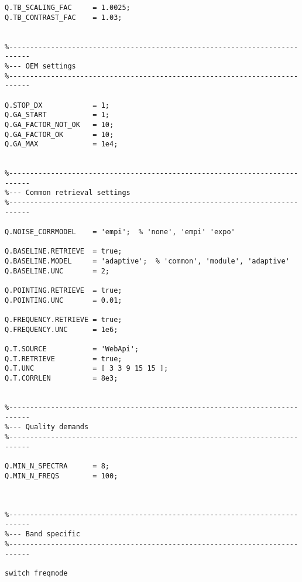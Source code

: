 \begin{verbatim}
Q.TB_SCALING_FAC     = 1.0025;
Q.TB_CONTRAST_FAC    = 1.03;


%---------------------------------------------------------------------------
%--- OEM settings
%---------------------------------------------------------------------------

Q.STOP_DX            = 1;
Q.GA_START           = 1;
Q.GA_FACTOR_NOT_OK   = 10;
Q.GA_FACTOR_OK       = 10;
Q.GA_MAX             = 1e4;


%---------------------------------------------------------------------------
%--- Common retrieval settings
%---------------------------------------------------------------------------

Q.NOISE_CORRMODEL    = 'empi';  % 'none', 'empi' 'expo'

Q.BASELINE.RETRIEVE  = true;
Q.BASELINE.MODEL     = 'adaptive';  % 'common', 'module', 'adaptive'
Q.BASELINE.UNC       = 2;

Q.POINTING.RETRIEVE  = true;
Q.POINTING.UNC       = 0.01;

Q.FREQUENCY.RETRIEVE = true;
Q.FREQUENCY.UNC      = 1e6;

Q.T.SOURCE           = 'WebApi';
Q.T.RETRIEVE         = true;
Q.T.UNC              = [ 3 3 9 15 15 ];
Q.T.CORRLEN          = 8e3;


%---------------------------------------------------------------------------
%--- Quality demands
%---------------------------------------------------------------------------

Q.MIN_N_SPECTRA      = 8;
Q.MIN_N_FREQS        = 100;



%---------------------------------------------------------------------------
%--- Band specific
%---------------------------------------------------------------------------

switch freqmode
  

\end{verbatim}
